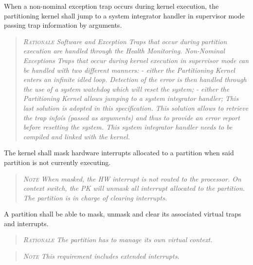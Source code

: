 When a non-nominal exception trap occurs during kernel execution, the partitioning kernel shall jump to a system integrator handler in supervisor mode passing trap information by arguments.
\begin{quote}\it
\textsc{Rationale}
Software and Exception Traps that occur during partition execution are handled through the Health Monitoring. Non-Nominal Exceptions Traps that occur during kernel execution in supervisor mode can be handled with two different manners:
- either the Partitioning Kernel enters an infinite idled loop. Detection of the error is then handled through the use of a system watchdog which will reset the system;
- either the Partitioning Kernel allows jumping to a system integrator handler;
This last solution is adopted in this specification. This solution allows to retrieve the trap infoís (passed as arguments) and thus to provide an error report before resetting the system.  This system integrator handler needs to be compiled and linked with the kernel.
\end{quote}

The kernel shall mask hardware interrupts allocated to a partition when said partition is not currently executing.
\begin{quote}\it
\textsc{Note}
When masked, the HW interrupt is not routed to the processor. On context switch, the PK will unmask all interrupt allocated to the partition. The partition is in charge of clearing interrupts.
\end{quote}

A partition shall be able to mask, unmask and clear its associated virtual traps and interrupts.
\begin{quote}\it
\textsc{Rationale}
The partition has to manage its own virtual context.
\end{quote}
\begin{quote}\it
\textsc{Note}
This requirement includes extended interrupts.
\end{quote}


